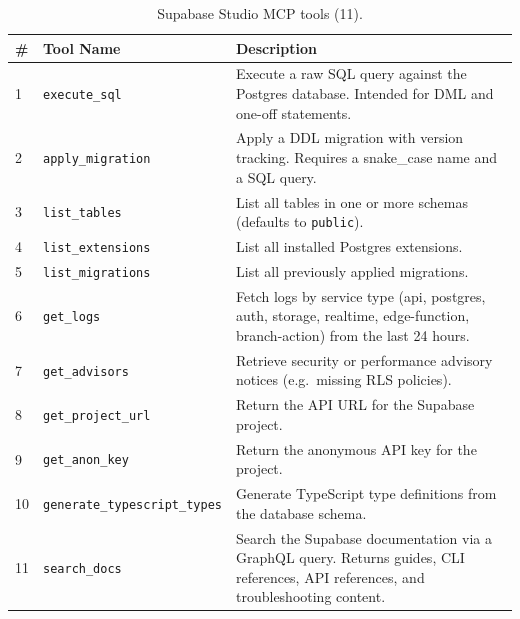 \begin{table}[!h]
\begin{subtable}{\textwidth}
\centering
\caption{Supabase Studio MCP tools (11).}
\label{tab:tools-supabase}
\small
\begin{tabular}{@{}llp{8.5cm}@{}}
\toprule
\textbf{\#} & \textbf{Tool Name} & \textbf{Description} \\
\midrule
1  & \texttt{execute\_sql}                & Execute a raw SQL query against the Postgres database. Intended for DML and one-off statements. \\
2  & \texttt{apply\_migration}            & Apply a DDL migration with version tracking. Requires a snake\_case name and a SQL query. \\
3  & \texttt{list\_tables}                & List all tables in one or more schemas (defaults to \texttt{public}). \\
4  & \texttt{list\_extensions}            & List all installed Postgres extensions. \\
5  & \texttt{list\_migrations}            & List all previously applied migrations. \\
6  & \texttt{get\_logs}                   & Fetch logs by service type (api, postgres, auth, storage, realtime, edge-function, branch-action) from the last 24 hours. \\
7  & \texttt{get\_advisors}               & Retrieve security or performance advisory notices (e.g.\ missing RLS policies). \\
8  & \texttt{get\_project\_url}           & Return the API URL for the Supabase project. \\
9  & \texttt{get\_anon\_key}              & Return the anonymous API key for the project. \\
10 & \texttt{generate\_typescript\_types} & Generate TypeScript type definitions from the database schema. \\
11 & \texttt{search\_docs}               & Search the Supabase documentation via a GraphQL query. Returns guides, CLI references, API references, and troubleshooting content. \\
\bottomrule
\end{tabular}
\end{subtable}

\vspace{1em}


\end{table}
